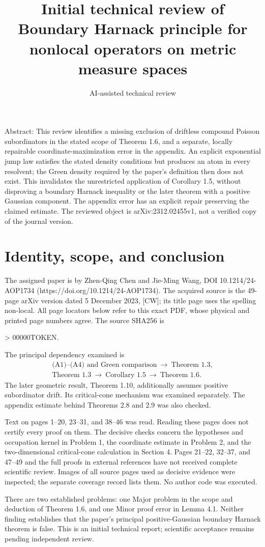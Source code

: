 \documentclass[10pt]{article}
\title{Initial technical review of
Boundary Harnack principle for nonlocal operators on metric measure spaces}
\author{AI-assisted technical review}
\date{}
\begin{document}
\maketitle
Abstract: This review identifies a missing exclusion of driftless compound Poisson subordinators in the stated scope of Theorem 1.6, and a separate, locally repairable coordinate-maximization error in the appendix. An explicit exponential jump law satisfies the stated density conditions but produces an atom in every resolvent; the Green density required by the paper’s definition then does not exist. This invalidates the unrestricted application of Corollary 1.5, without disproving a boundary Harnack inequality or the later theorem with a positive Gaussian component. The appendix error has an explicit repair preserving the claimed estimate. The reviewed object is arXiv:2312.02455v1, not a verified copy of the journal version.\par
\section*{Identity, scope, and conclusion}
The assigned paper is by Zhen-Qing Chen and Jie-Ming Wang, DOI 10.1214/24-AOP1734 (https://doi.org/10.1214/24-AOP1734). The acquired source is the 49-page arXiv version dated 5 December 2023, [CW]; its title page uses the spelling non-local. All page locators below refer to this exact PDF, whose physical and printed page numbers agree. The source SHA256 is\par
> 00000TOKEN.\par
The principal dependency examined is \[\begin{gathered}
\text{(A1)--(A4) and Green comparison}\ \longrightarrow\ \text{Theorem 1.3},\\
\text{Theorem 1.3}\ \longrightarrow\ \text{Corollary 1.5}
\ \longrightarrow\ \text{Theorem 1.6}.
\end{gathered}\] The later geometric result, Theorem 1.10, additionally assumes positive subordinator drift. Its critical-cone mechanism was examined separately. The appendix estimate behind Theorems 2.8 and 2.9 was also checked.\par
Text on pages 1–20, 23–31, and 38–46 was read. Reading these pages does not certify every proof on them. The decisive checks concern the hypotheses and occupation kernel in Problem 1, the coordinate estimate in Problem 2, and the two-dimensional critical-cone calculation in Section 4. Pages 21–22, 32–37, and 47–49 and the full proofs in external references have not received complete scientific review. Images of all source pages used as decisive evidence were inspected; the separate coverage record lists them. No author code was executed.\par
There are two established problems: one Major problem in the scope and deduction of Theorem 1.6, and one Minor proof error in Lemma 4.1. Neither finding establishes that the paper’s principal positive-Gaussian boundary Harnack theorem is false. This is an initial technical report; scientific acceptance remains pending independent review.\par
\end{document}
